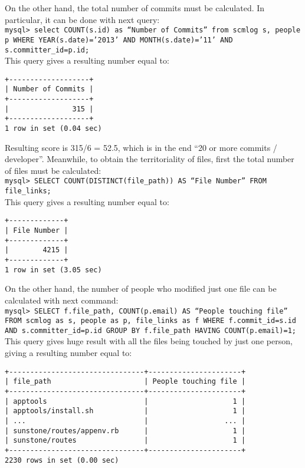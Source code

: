 \documentclass[11pt]{article}
\newcommand{\mysqlcmd}[1]{\\\indent\indent\texttt{mysql> #1}\\}
\begin{document}
\begin{itemize}
\begin{itemize}
\begin{verbatim}
\end{verbatim}
On the other hand, the total number of commits must be calculated. In particular, it can be done with next query:
\mysqlcmd{select COUNT(s.id) as ``Number of Commits'' from scmlog s, people p WHERE YEAR(s.date)='2013' AND MONTH(s.date)='11' AND s.committer\_id=p.id;}
This query gives a resulting number equal to:
\begin{verbatim}
+-------------------+
| Number of Commits |
+-------------------+
|               315 |
+-------------------+
1 row in set (0.04 sec)
\end{verbatim}
Resulting score is 315/6 = 52.5, which is in the end ``20 or more commits / developer''.
Meanwhile, to obtain the territoriality of files, first the total number of files must be calculated:
\mysqlcmd{SELECT COUNT(DISTINCT(file\_path)) AS ``File Number'' FROM file\_links;}
This query gives a resulting number equal to:
\begin{verbatim}
+-------------+
| File Number |
+-------------+
|        4215 |
+-------------+
1 row in set (3.05 sec)
\end{verbatim}
On the other hand, the number of people who modified just one file can be calculated with next command:
\mysqlcmd{SELECT f.file\_path, COUNT(p.email) AS ``People touching file'' FROM scmlog as s, people as p, file\_links as f WHERE f.commit\_id=s.id AND s.committer\_id=p.id GROUP BY f.file\_path HAVING COUNT(p.email)=1;}
This query gives huge result with all the files being touched by just one person, giving a resulting number equal to:
\begin{verbatim}
+--------------------------------+----------------------+
| file_path                      | People touching file |
+--------------------------------+----------------------+
| apptools                       |                    1 |
| apptools/install.sh            |                    1 |
| ...                            |                  ... |
| sunstone/routes/appenv.rb      |                    1 |
| sunstone/routes                |                    1 |
+--------------------------------+----------------------+
2230 rows in set (0.00 sec)


\end{verbatim}
\end{itemize}
\end{itemize}
\end{document}
